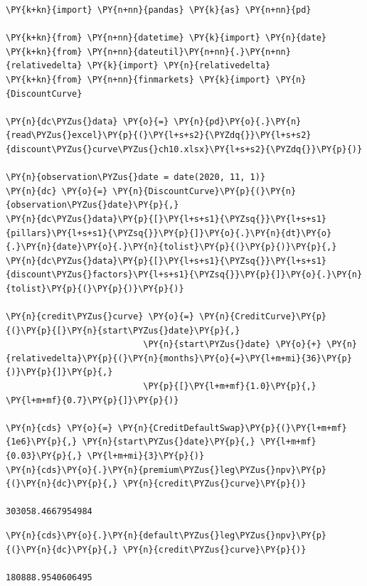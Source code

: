 \begin{codebox}
\begin{Verbatim}[commandchars=\\\{\}]
\PY{k+kn}{import} \PY{n+nn}{pandas} \PY{k}{as} \PY{n+nn}{pd}
	
\PY{k+kn}{from} \PY{n+nn}{datetime} \PY{k}{import} \PY{n}{date}
\PY{k+kn}{from} \PY{n+nn}{dateutil}\PY{n+nn}{.}\PY{n+nn}{relativedelta} \PY{k}{import} \PY{n}{relativedelta}
\PY{k+kn}{from} \PY{n+nn}{finmarkets} \PY{k}{import} \PY{n}{DiscountCurve}
	
\PY{n}{dc\PYZus{}data} \PY{o}{=} \PY{n}{pd}\PY{o}{.}\PY{n}{read\PYZus{}excel}\PY{p}{(}\PY{l+s+s2}{\PYZdq{}}\PY{l+s+s2}{discount\PYZus{}curve\PYZus{}ch10.xlsx}\PY{l+s+s2}{\PYZdq{}}\PY{p}{)}

\PY{n}{observation\PYZus{}date = date(2020, 11, 1)}        
\PY{n}{dc} \PY{o}{=} \PY{n}{DiscountCurve}\PY{p}{(}\PY{n}{observation\PYZus{}date}\PY{p}{,} 
\PY{n}{dc\PYZus{}data}\PY{p}{[}\PY{l+s+s1}{\PYZsq{}}\PY{l+s+s1}{pillars}\PY{l+s+s1}{\PYZsq{}}\PY{p}{]}\PY{o}{.}\PY{n}{dt}\PY{o}{.}\PY{n}{date}\PY{o}{.}\PY{n}{tolist}\PY{p}{(}\PY{p}{)}\PY{p}{,}
\PY{n}{dc\PYZus{}data}\PY{p}{[}\PY{l+s+s1}{\PYZsq{}}\PY{l+s+s1}{discount\PYZus{}factors}\PY{l+s+s1}{\PYZsq{}}\PY{p}{]}\PY{o}{.}\PY{n}{tolist}\PY{p}{(}\PY{p}{)}\PY{p}{)}

\PY{n}{credit\PYZus{}curve} \PY{o}{=} \PY{n}{CreditCurve}\PY{p}{(}\PY{p}{[}\PY{n}{start\PYZus{}date}\PY{p}{,} 
                           \PY{n}{start\PYZus{}date} \PY{o}{+} \PY{n}{relativedelta}\PY{p}{(}\PY{n}{months}\PY{o}{=}\PY{l+m+mi}{36}\PY{p}{)}\PY{p}{]}\PY{p}{,} 
                           \PY{p}{[}\PY{l+m+mf}{1.0}\PY{p}{,} \PY{l+m+mf}{0.7}\PY{p}{]}\PY{p}{)}

\PY{n}{cds} \PY{o}{=} \PY{n}{CreditDefaultSwap}\PY{p}{(}\PY{l+m+mf}{1e6}\PY{p}{,} \PY{n}{start\PYZus{}date}\PY{p}{,} \PY{l+m+mf}{0.03}\PY{p}{,} \PY{l+m+mi}{3}\PY{p}{)}
\PY{n}{cds}\PY{o}{.}\PY{n}{premium\PYZus{}leg\PYZus{}npv}\PY{p}{(}\PY{n}{dc}\PY{p}{,} \PY{n}{credit\PYZus{}curve}\PY{p}{)}

303058.4667954984
\end{Verbatim}
\end{codebox}

\begin{codebox}
\begin{Verbatim}[commandchars=\\\{\}]
\PY{n}{cds}\PY{o}{.}\PY{n}{default\PYZus{}leg\PYZus{}npv}\PY{p}{(}\PY{n}{dc}\PY{p}{,} \PY{n}{credit\PYZus{}curve}\PY{p}{)}

180888.9540606495
\end{Verbatim}
\end{codebox}

